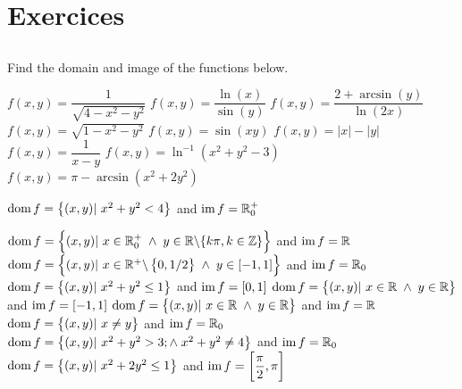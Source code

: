 \newpage
\section{Exercices}
\renewcommand{\ExerciseListName}{Assignement}

\subsection*{}
\begin{Exercise} Find the domain and image of the functions below.
\begin{multicols}{2}
	\ifcalculus
	\Question[difficulty=1] $f(x,y) = \dfrac{1}{\sqrt{4-x^2-y^2}}$ 
	\fi
	\Question[difficulty=1] $f(x,y)=\dfrac{\ln (x)}{\sin (y)}$
	\Question[difficulty=3] $f(x,y)=\dfrac{2+\arcsin (y)}{\ln (2x)}$
	\ifanalysis\Question[difficulty=1]\fi\ifcalculus\Question[difficulty=2]\fi  $f(x,y) = \sqrt{1-x^2-y^2}$
	\ifanalysis\Question[difficulty=1]\fi\ifcalculus\Question[difficulty=2]\fi $f(x,y) = \sin (xy)$
	\ifanalysis\Question[difficulty=2]\fi\ifcalculus\Question[difficulty=3]\fi $f(x,y) = |x| - |y|$
	\Question[difficulty=1] $f(x,y)=\dfrac{1}{x-y}$
	\ifanalysis\Question[difficulty=2]\fi\ifcalculus\Question[difficulty=3]\fi $f(x,y) = \ln^{-1} (x^2 + y^2 - 3)$
	\ifanalysis\Question[difficulty=2]\fi\ifcalculus\Question[difficulty=3]\fi $f(x,y)=\pi - \arcsin (x^2 + 2y^2)$
    \EndCurrentQuestion
\end{multicols}
\end{Exercise}

\begin{Answer}
    
    \Question $\text{dom}{\,} f = \left\{ (x,y) | \ x^2 + y^2 < 4 \right\}$ \quad and \quad $\text{im}{\,} f =  \mathbb{R}_0^+$ %

    \Question $\text{dom}{\,} f = \left\{ (x,y) | \ x \in \mathbb{R}^+_0 \; \wedge \; y \in \mathbb{R} \backslash \{k \pi, k \in \mathbb{Z} \}\right\}$ \quad and \quad $\text{im}{\,} f = \mathbb{R}$
    \Question $\text{dom}{\,} f = \left\{ (x,y) | \ x \in \mathbb{R}^+\backslash \left\{0,1/2\right\} \; \wedge \; y \in [-1,1]\right\}$ \quad and \quad $\text{im}{\,} f = \mathbb{R}_0$
    \Question $\text{dom}{\,} f = \left\{ (x,y) | \ x^2 + y^2 \leq 1 \right\}$ \quad and \quad $\text{im}{\,} f = [0,1]$
    \Question $\text{dom}{\,} f = \left\{ (x,y) | \ x \in \mathbb{R}\; \wedge \; y \in \mathbb{R} \right\}$ \quad and \quad $\text{im}{\,} f = [-1,1]$
    \Question $\text{dom}{\,} f = \left\{ (x,y) | \ x \in \mathbb{R}\; \wedge \; y \in \mathbb{R} \right\}$ \quad and \quad $\text{im}{\,} f = \mathbb{R}$
    \Question $\text{dom}{\,} f = \left\{ (x,y) | \ x \neq y \right\}$ \quad and \quad $\text{im}{\,} f = \mathbb{R}_0$
    \Question $\text{dom}{\,} f = \left\{ (x,y) | \ x^2 + y^2 > 3; \wedge \; x^2 + y^2 \neq 4 \right\}$ \quad and \quad $\text{im}{\,} f = \mathbb{R}_0$
    \Question $\text{dom}{\,} f = \left\{ (x,y) |  \ x^2 + 2y^2 \leq 1 \right\}$ \quad and \quad $\text{im}{\,} f = \left[ \dfrac{\pi}{2}, \pi \right]$
    
\end{Answer}

